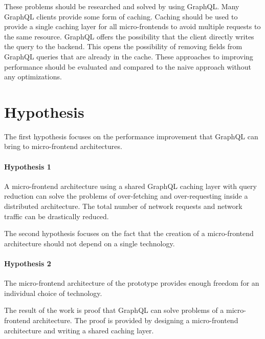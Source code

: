 \bigskip

\noindent These problems should be researched and solved by using GraphQL. Many GraphQL clients provide some form of caching. Caching should be used to provide a single caching layer for all micro-frontends to avoid multiple requests to the same resource. GraphQL offers the possibility that the client directly writes the query to the backend. This opens the possibility of removing fields from GraphQL queries that are already in the cache. These approaches to improving performance should be evaluated and compared to the naive approach without any optimizations.

\section{Hypothesis}\label{section:introduction:hypothesis}

The first hypothesis focuses on the performance improvement that GraphQL can bring to micro-frontend architectures.

\paragraph{Hypothesis 1} 
A micro-frontend architecture using a shared GraphQL caching layer with query reduction can solve the problems of over-fetching and over-requesting inside a distributed architecture. The total number of network requests and network traffic can be drastically reduced.

\bigskip

\noindent The second hypothesis focuses on the fact that the creation of a micro-frontend architecture should not depend on a single technology.

\paragraph{Hypothesis 2}
The micro-frontend architecture of the prototype provides enough freedom for an individual choice of technology.

\bigskip

\noindent The result of the work is proof that GraphQL can solve problems of a micro-frontend architecture. The proof is provided by designing a micro-frontend architecture and writing a shared caching layer.
